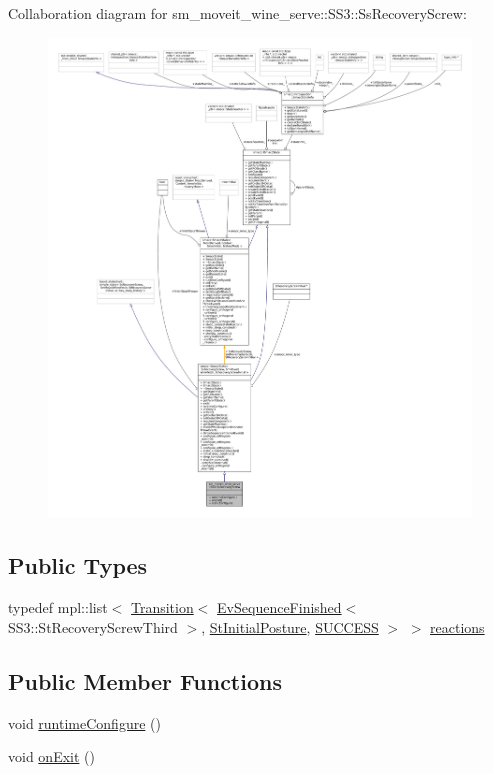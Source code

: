 Collaboration diagram for sm\+\_\+moveit\+\_\+wine\+\_\+serve\+:\+:S\+S3\+:\+:Ss\+Recovery\+Screw\+:
\nopagebreak
\begin{figure}[H]
\begin{center}
\leavevmode
\includegraphics[width=350pt]{structsm__moveit__wine__serve_1_1SS3_1_1SsRecoveryScrew__coll__graph}
\end{center}
\end{figure}
\subsection*{Public Types}
\begin{DoxyCompactItemize}
\item 
typedef mpl\+::list$<$ \hyperlink{classsmacc_1_1Transition}{Transition}$<$ \hyperlink{structsmacc_1_1default__events_1_1EvSequenceFinished}{Ev\+Sequence\+Finished}$<$ S\+S3\+::\+St\+Recovery\+Screw\+Third $>$, \hyperlink{structsm__moveit__wine__serve_1_1StInitialPosture}{St\+Initial\+Posture}, \hyperlink{structsmacc_1_1default__transition__tags_1_1SUCCESS}{S\+U\+C\+C\+E\+SS} $>$ $>$ \hyperlink{structsm__moveit__wine__serve_1_1SS3_1_1SsRecoveryScrew_ad51fd98af4a0552d56655b0f289c0bca}{reactions}
\end{DoxyCompactItemize}
\subsection*{Public Member Functions}
\begin{DoxyCompactItemize}
\item 
void \hyperlink{structsm__moveit__wine__serve_1_1SS3_1_1SsRecoveryScrew_a9e90059fc40e7aa88f7d8aec9cad353f}{runtime\+Configure} ()
\item 
void \hyperlink{structsm__moveit__wine__serve_1_1SS3_1_1SsRecoveryScrew_aad733102e5f6f7e9bce89df08dfb09f4}{on\+Exit} ()
\end{DoxyCompactItemize}
